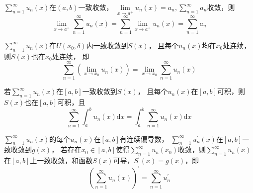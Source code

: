 \begin{theorem}[逐项单向极限]
  $\sum\limits_{n = 1}^{\infty}u_n(x)$在$(a,b)$一致收敛，
  $\lim \limits _{x \rightarrow a^+}u_n(x) = a_n, \sum\limits_{n = 1}^{\infty}a_n$收敛，则
  \begin{equation*}
    \lim \limits _{x \rightarrow a^+} \sum\limits_{n = 1}^{\infty}u_n(x) = \sum\limits_{n = 1}^{\infty}\lim \limits _{x \rightarrow a^+}u_n(x) = \sum\limits_{n = 1}^{\infty}a_n
  \end{equation*}
\end{theorem}

\begin{theorem}[连续性]
  $\sum\limits_{n = 1}^{\infty}u_n(x)$在$U(x_0,\delta)$内一致收敛到$S(x)$，
  且每个$u_n(x)$均在$x_0$处连续，则$S(x)$也在$x_0$处连续，
  即
  \begin{equation*}
    \sum\limits_{n = 1}^{\infty}(\lim \limits _{x \rightarrow x_0}u_n(x)) = \lim \limits _{x \rightarrow x_0} \sum\limits_{n = 1}^{\infty}u_n(x)
  \end{equation*}
\end{theorem}

\begin{theorem}[逐项积分]
  若$\sum\limits_{n = 1}^{\infty}u_n(x)$在$[a,b]$一致收敛到$S(x)$，
  且每个$u_n(x)$在$[a,b]$可积，则$S(x)$也在$[a,b]$可积，且
  \begin{equation*}
    \sum\limits_{n = 1}^{\infty}\int_a^b u_n(x)\mathrm{d} x = \int_a^b \sum\limits_{n = 1}^{\infty}u_n(x) \mathrm{d} x
  \end{equation*}
\end{theorem}

\begin{theorem}[逐项可微]
  $\sum\limits_{n = 1}^{\infty}u_n(x)$的每个$u_n(x)$在$[a,b]$有连续偏导数，
  $\sum\limits_{n = 1}^{\infty}u_n^{\prime}(x)$在$[a,b]$一致收敛到$g(x)$，
  若存在$x_0 \in [a,b]$使得$\sum\limits_{n = 1}^{\infty}u_n(x_0)$收敛，则$\sum\limits_{n = 1}^{\infty}u_n(x)$在$[a,b]$上一致收敛，和函数$S(x)$可导，$S^{\prime}(x) = g(x)$，即
  \begin{equation*}
    (\sum\limits_{n = 1}^{\infty}u_n(x))^{\prime} = \sum\limits_{n = 1}^{\infty}u_n^{\prime}
  \end{equation*}
\end{theorem}